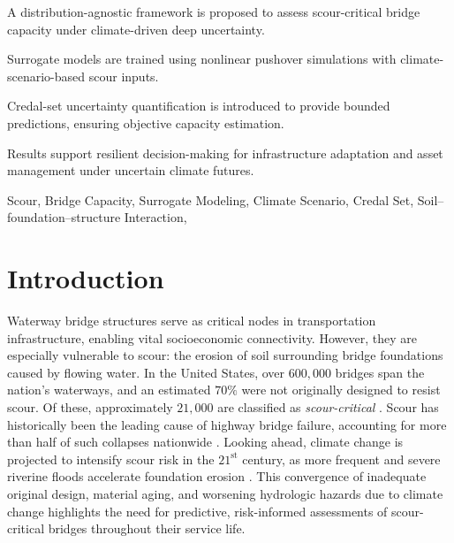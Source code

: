 \documentclass[authoryear,preprint,review,12pt]{elsarticle}
\begin{document}
\begin{frontmatter}
\begin{highlights}
\item A distribution-agnostic framework is proposed to assess scour-critical bridge capacity under climate-driven deep uncertainty.
\item Surrogate models are trained using nonlinear pushover simulations with climate-scenario-based scour inputs.
\item Credal-set uncertainty quantification is introduced to provide bounded predictions, ensuring objective capacity estimation.
\item Results support resilient decision-making for infrastructure adaptation and asset management under uncertain climate futures.
\end{highlights}


\begin{keyword}
Scour\sep
Bridge Capacity\sep
Surrogate Modeling\sep
Climate Scenario\sep
Credal Set\sep
Soil–foundation–structure Interaction\sep
\end{keyword}



\end{frontmatter}



\linenumbers






\section{Introduction}
Waterway bridge structures serve as critical nodes in transportation infrastructure, enabling vital socioeconomic connectivity. However, they are especially vulnerable to scour: the erosion of soil surrounding bridge foundations caused by flowing water. In the United States, over $600{,}000$ bridges span the nation's waterways, and an estimated $70\%$ were not originally designed to resist scour. Of these, approximately $21{,}000$ are classified as \textit{scour-critical} \citep{USGS2018}. Scour has historically been the leading cause of highway bridge failure, accounting for more than half of such collapses nationwide \citep{Sipson2019}. Looking ahead, climate change is projected to intensify scour risk in the $21^\text{st}$ century, as more frequent and severe riverine floods accelerate foundation erosion \citep{Cranston2022}. This convergence of inadequate original design, material aging, and worsening hydrologic hazards due to climate change highlights the need for predictive, risk-informed assessments of scour-critical bridges throughout their service life.
\end{document}

